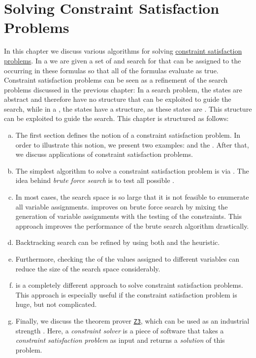 \chapter{Solving Constraint Satisfaction Problems}
In this chapter we discuss various algorithms for solving 
\href{https://en.wikipedia.org/wiki/Constraint_satisfaction_problem}{constraint satisfaction problems}.
In a  we are given a set of  and search for 
that can be 
assigned to the  occurring in these formulas so that all of the formulas evaluate as true.
Constraint satisfaction problems can be seen as a refinement of the search problems discussed in the previous
chapter:  In a search problem, the states are abstract and therefore have no structure that can be exploited to
guide the search, while in a , the states have a structure, as these
states are .  This structure can be exploited to guide the search.  This chapter is
structured as follows: 
\begin{enumerate}[(a)]
\item The first section defines the notion of a constraint satisfaction problem.  In order to illustrate this
      notion, we present two examples:  and the .  After that, we discuss
      applications of constraint satisfaction problems. 
\item The simplest algorithm to solve a constraint satisfaction problem is via .
      The idea behind \emph{brute force search} is to test all possible .
\item In most cases, the search space is so large that it is not feasible to enumerate all variable assignments.
       improves on brute force search by mixing the generation
      of variable assignments with the testing of the constraints.  This approach
      improves the performance of the brute search algorithm drastically.
\item Backtracking search can be refined by using both  and 
      the  heuristic.
\item Furthermore, checking the  of the values assigned to different variables
      can reduce the size of the search space considerably. 
\item {} is a completely different approach to solve
      constraint satisfaction problems.  This approach is especially useful if the constraint satisfaction
      problem is huge, but not complicated.
\item Finally, we discuss the theorem prover \href{https://microsoft.github.io/z3guide/}{\texttt{Z3}}, which
      can be used as an industrial strength .  Here, a \emph{constraint solver} is a
      piece of software that takes a \emph{constraint satisfaction problem} as input and returns a \emph{solution} of
      this problem.
\end{enumerate}
